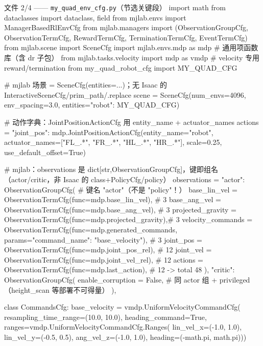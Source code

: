 \begin{codebox}[Python]{文件 2/4 —— \texttt{my\_quad\_env\_cfg.py}（节选关键段）}
import math
from dataclasses import dataclass, field
from mjlab.envs import ManagerBasedRlEnvCfg
from mjlab.managers import (ObservationGroupCfg, ObservationTermCfg, RewardTermCfg,
                            TerminationTermCfg, EventTermCfg)
from mjlab.scene import SceneCfg
import mjlab.envs.mdp as mdp                 # 通用项函数库（含 dr 子包）
from mjlab.tasks.velocity import mdp as vmdp # velocity 专用 reward/termination
from my_quad_robot_cfg import MY_QUAD_CFG

# mjlab 场景 = SceneCfg(entities={...})；无 Isaac 的 InteractiveSceneCfg/prim_path/.replace
scene = SceneCfg(num_envs=4096, env_spacing=3.0, entities={"robot": MY_QUAD_CFG})

# 动作字典：JointPositionActionCfg 用 entity_name + actuator_names
actions = {"joint_pos": mdp.JointPositionActionCfg(entity_name="robot",
    actuator_names=["FL_.*", "FR_.*", "HL_.*", "HR_.*"],
    scale=0.25, use_default_offset=True)}

# mjlab：observations 是 dict[str,ObservationGroupCfg]，键即组名（actor/critic，非 Isaac 的 class+PolicyCfg/policy）
observations = {
    "actor": ObservationGroupCfg(                                          # 键名 "actor"（不是 "policy"！）
        base_lin_vel = ObservationTermCfg(func=mdp.base_lin_vel),          # 3
        base_ang_vel = ObservationTermCfg(func=mdp.base_ang_vel),          # 3
        projected_gravity = ObservationTermCfg(func=mdp.projected_gravity),# 3
        velocity_commands = ObservationTermCfg(func=mdp.generated_commands,
            params={"command_name": "base_velocity"}),       # 3
        joint_pos = ObservationTermCfg(func=mdp.joint_pos_rel),            # 12
        joint_vel = ObservationTermCfg(func=mdp.joint_vel_rel),            # 12
        actions   = ObservationTermCfg(func=mdp.last_action),              # 12  -> total 48
    ),
    "critic": ObservationGroupCfg(
        enable_corruption = False,
        # 同 actor 组 + privileged（height_scan 等部署不可得量）
    ),
}

class CommandsCfg:
    base_velocity = vmdp.UniformVelocityCommandCfg(
        resampling_time_range=(10.0, 10.0), heading_command=True,
        ranges=vmdp.UniformVelocityCommandCfg.Ranges(
            lin_vel_x=(-1.0, 1.0), lin_vel_y=(-0.5, 0.5),
            ang_vel_z=(-1.0, 1.0), heading=(-math.pi, math.pi)))


\end{codebox}
